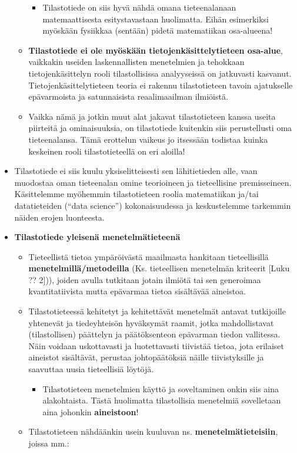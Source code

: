 \documentclass[
]{book}
\providecommand{\tightlist}{%
  \setlength{\itemsep}{0pt}\setlength{\parskip}{0pt}}
\begin{document}
\begin{itemize}
\begin{itemize}
    \begin{itemize}
    \tightlist
    \item
      Tilastotiede on siis hyvä nähdä omana tieteenalanaan matemaattisesta esitystavastaan huolimatta. Eihän esimerkiksi myöskään fysiikkaa (sentään) pidetä matematiikan osa-alueena!
    \end{itemize}
  \item
    \textbf{Tilastotiede ei ole myöskään tietojenkäsittelytieteen osa-alue}, vaikkakin useiden laskennallisten menetelmien ja tehokkaan tietojenkäsittelyn rooli tilastollisissa analyyseissä on jatkuvasti kasvanut. Tietojenkäsittelytieteen teoria ei rakennu tilastotieteen tavoin ajatukselle epävarmoista ja satunnaisista reaalimaailman ilmiöistä.
  \item
    Vaikka nämä ja jotkin muut alat jakavat tilastotieteen kanssa useita piirteitä ja ominaisuuksia, on tilastotiede kuitenkin siis perustellusti oma tieteenalansa. Tämä erottelun vaikeus jo itsessään todistaa kuinka keskeinen rooli tilastotieteellä on eri aloilla!
  \end{itemize}
\item
  Tilastotiede ei siis kuulu yksiselitteisesti sen lähitietieden alle, vaan muodostaa oman tieteenalan omine teorioineen ja tieteellisine premisseineen. Käsittelemme myöhemmin tilastotieteen roolia matematiikan ja/tai datatieteiden (``data science'') kokonaisuudessa ja keskustelemme tarkemmin näiden erojen luonteesta.
\item
  \textbf{Tilastotiede yleisenä menetelmätieteenä}

  \begin{itemize}
  \tightlist
  \item
    Tieteellistä tietoa ympäröivästä maailmasta hankitaan tieteellisillä \textbf{menetelmillä/metodeilla} (Ks. tieteellisen menetelmän kriteerit {[}Luku ?? 2{]})), joiden avulla tutkitaan jotain ilmiötä tai sen generoimaa kvantitatiivista mutta epävarmaa tietoa sisältävää aineistoa.
  \item
    Tilastotieteessä kehitetyt ja kehitettävät menetelmät antavat tutkijoille yhtenevät ja tiedeyhteisön hyväksymät raamit, jotka mahdollistavat (tilastollisen) päättelyn ja päätöksenteon epävarman tiedon vallitessa. Näin voidaan uskottavasti ja luotettavasti tiivistää tietoa, jota erilaiset aineistot sisältävät, perustaa johtopäätöksiä näille tiivistyksille ja saavuttaa uusia tieteellisiä löytöjä.

    \begin{itemize}
    \tightlist
    \item
      Tilastotieteen menetelmien käyttö ja soveltaminen onkin siis aina alakohtaista. Tästä huolimatta tilastollisia menetelmiä sovelletaan aina johonkin \textbf{aineistoon}!
    \end{itemize}
  \item
    Tilastotieteen nähdäänkin usein kuuluvan ns. \textbf{menetelmätieteisiin}, joissa mm.:


\end{itemize}
\end{itemize}
\end{document}
